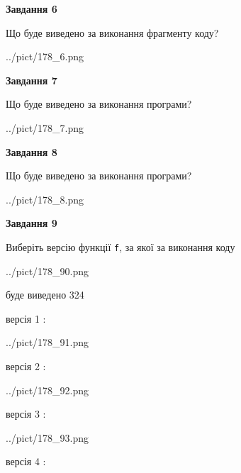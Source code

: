 \documentclass[12pt, ukrainian]{article}
\def\code#1{\Verb!#1!}
\begin{document}
{\begin {large}
{\begin {center}\textbf{Завдання 6}\end {center}}

Що буде виведено за виконання фрагменту коду?\par
\begin{center}
	{../pict/178_6.png}
\end{center}
\newpage

{\begin {center}\textbf{Завдання 7}\end {center}}

Що буде виведено за виконання програми?\par
\begin{center}
	{../pict/178_7.png}
\end{center}
\newpage

{\begin {center}\textbf{Завдання 8}\end {center}}

Що буде виведено за виконання програми?\par
\begin{center}
	{../pict/178_8.png}
\end{center}
\newpage

{\begin {center}\textbf{Завдання 9}\end {center}}

Виберіть версію функції \code{f}, за якої за виконання коду
\begin{center}
	{../pict/178_90.png}
\end{center}
буде виведено 324

\vspace{5mm}
версія 1 :

\begin{center}
	{../pict/178_91.png}
\end{center}
версія 2 :

\begin{center}
	{../pict/178_92.png}
\end{center}
версія 3 :

\begin{center}
	{../pict/178_93.png}
\end{center}
версія 4 :


\end{large}}
\end{document}
